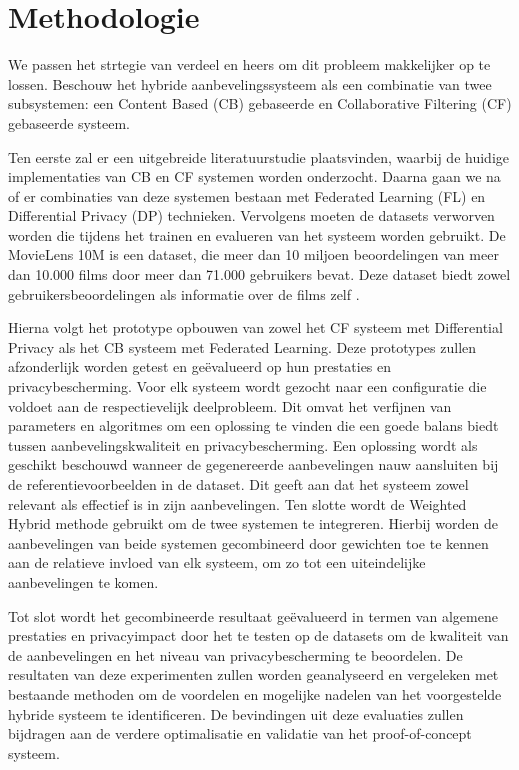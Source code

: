 
\section{Methodologie}%
\label{sec:methodologie}

We passen het strtegie van verdeel en heers om dit probleem makkelijker op te lossen. Beschouw het hybride aanbevelingssysteem als een combinatie van twee subsystemen: een Content Based (CB) gebaseerde en Collaborative Filtering (CF) gebaseerde systeem. 

Ten eerste zal er een uitgebreide literatuurstudie plaatsvinden, waarbij de huidige implementaties van CB en CF systemen worden onderzocht. Daarna gaan we na of er combinaties van deze systemen bestaan met Federated Learning (FL) en Differential Privacy (DP) technieken.
Vervolgens moeten de datasets verworven worden die tijdens het trainen en evalueren van het systeem worden gebruikt. De MovieLens 10M is een dataset, die meer dan 10 miljoen beoordelingen van meer dan 10.000 films door meer dan 71.000 gebruikers bevat. Deze dataset biedt zowel gebruikersbeoordelingen als informatie over de films zelf \autocite{Mazeh2020}.

Hierna volgt het prototype opbouwen van zowel het CF systeem met Differential Privacy als het CB systeem met Federated Learning. Deze prototypes zullen afzonderlijk worden getest en geëvalueerd op hun prestaties en privacybescherming. Voor elk systeem wordt gezocht naar een configuratie die voldoet aan de respectievelijk deelprobleem. Dit omvat het verfijnen van parameters en algoritmes om een oplossing te vinden die een goede balans biedt tussen aanbevelingskwaliteit en privacybescherming. Een oplossing wordt als geschikt beschouwd wanneer de gegenereerde aanbevelingen nauw aansluiten bij de referentievoorbeelden in de dataset. Dit geeft aan dat het systeem zowel relevant als effectief is in zijn aanbevelingen. Ten slotte wordt de Weighted Hybrid methode gebruikt om de twee systemen te integreren. Hierbij worden de aanbevelingen van beide systemen gecombineerd door gewichten toe te kennen aan de relatieve invloed van elk systeem, om zo tot een uiteindelijke aanbevelingen te komen.

Tot slot wordt het gecombineerde resultaat geëvalueerd in termen van algemene prestaties en privacyimpact door het te testen op de datasets om de kwaliteit van de aanbevelingen en het niveau van privacybescherming te beoordelen. De resultaten van deze experimenten zullen worden geanalyseerd en vergeleken met bestaande methoden om de voordelen en mogelijke nadelen van het voorgestelde hybride systeem te identificeren. De bevindingen uit deze evaluaties zullen bijdragen aan de verdere optimalisatie en validatie van het proof-of-concept systeem.

